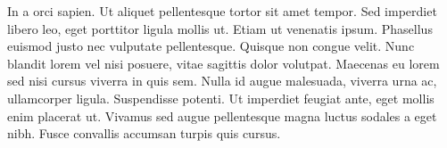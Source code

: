 In a orci sapien. Ut aliquet pellentesque tortor sit amet tempor. Sed imperdiet libero leo, eget porttitor ligula mollis ut. Etiam ut venenatis ipsum. Phasellus euismod justo nec vulputate pellentesque. Quisque non congue velit. Nunc blandit lorem vel nisi posuere, vitae sagittis dolor volutpat. Maecenas eu lorem sed nisi cursus viverra in quis sem. Nulla id augue malesuada, viverra urna ac, ullamcorper ligula. Suspendisse potenti. Ut imperdiet feugiat ante, eget mollis enim placerat ut. Vivamus sed augue pellentesque magna luctus sodales a eget nibh. Fusce convallis accumsan turpis quis cursus.


